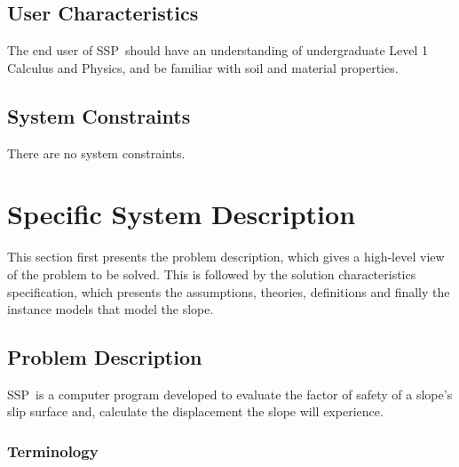 \documentclass[12pt]{article}
\newcommand{\progname}{SSP}
\begin{document}
\subsection{User Characteristics}

The end user of \progname\ should have an understanding of undergraduate
Level 1 Calculus and Physics, and be familiar with soil and material
properties.

\subsection{System Constraints}

There are no system constraints.

\section{Specific System Description}

This section first presents the problem description, which gives a
high-level view of the problem to be solved.  This is followed by the
solution characteristics specification, which presents the
assumptions, theories, definitions and finally the instance models
that model the slope. \\

\subsection{Problem Description} \label{Sec_pd}

\progname\ is a computer program developed to evaluate the factor of safety
of a slope's slip surface and, calculate the displacement the slope
will experience.

\subsubsection{Terminology}
\end{document}
